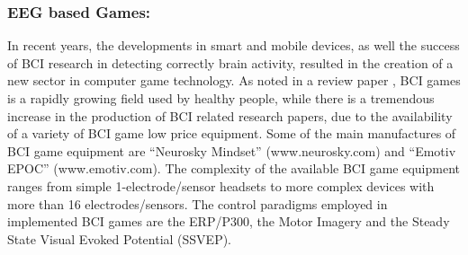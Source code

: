 \subsubsection{\bf{EEG based Games:}}
In recent years, the developments in smart and mobile devices, as well the success of BCI research in detecting correctly brain activity, resulted in the creation of a new sector in computer game technology. As noted in a review paper \citep{Ahn2014}, BCI games is a rapidly growing field used by healthy people, while there is a tremendous increase in the production of BCI related research papers, due to the availability of a variety of BCI game low price equipment. Some of the main manufactures of BCI game equipment are “Neurosky Mindset” (www.neurosky.com) and “Emotiv EPOC” (www.emotiv.com).  The complexity of the available BCI game equipment ranges from simple 1-electrode/sensor headsets to more complex devices with more than 16 electrodes/sensors. The control paradigms employed in implemented BCI games are the ERP/P300, the Motor Imagery and the Steady State Visual Evoked Potential (SSVEP).























